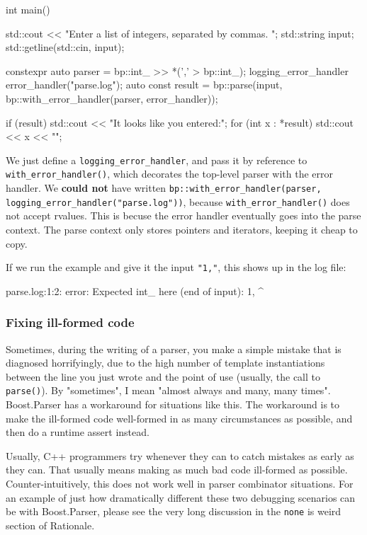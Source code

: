 \begin{code}
int main()
{
    std::cout << "Enter a list of integers, separated by commas. ";
    std::string input;
    std::getline(std::cin, input);

    constexpr auto parser = bp::int_ >> *(',' > bp::int_);
    logging_error_handler error_handler("parse.log");
    auto const result = bp::parse(input, bp::with_error_handler(parser, error_handler));

    if (result) {
        std::cout << "It looks like you entered:\n";
        for (int x : *result) {
            std::cout << x << "\n";
        }
    }
}
\end{code}

We just define a \texttt{logging\_error\_handler}, and pass it by reference to \texttt{with\_error\_handler()}, which decorates the top-level parser with the error handler. We \textbf{could not} have written \texttt{bp::with\_error\_handler(parser, logging\_error\_handler("parse.log"))}, because \texttt{with\_error\_handler()} does not accept rvalues. This is becuse the error handler eventually goes into the parse context. The parse context only stores pointers and iterators, keeping it cheap to copy.

If we run the example and give it the input \texttt{"1,"}, this shows up in the log file:

\begin{code}
parse.log:1:2: error: Expected int_ here (end of input):
1,
  ^
\end{code}

\subsubsection{Fixing ill-formed code}

Sometimes, during the writing of a parser, you make a simple mistake that is diagnosed horrifyingly, due to the high number of template instantiations between the line you just wrote and the point of use (usually, the call to \texttt{parse()}). By "sometimes", I mean "almost always and many, many times". Boost.Parser has a workaround for situations like this. The workaround is to make the ill-formed code well-formed in as many circumstances as possible, and then do a runtime assert instead.

Usually, C++ programmers try whenever they can to catch mistakes as early as they can. That usually means making as much bad code ill-formed as possible. Counter-intuitively, this does not work well in parser combinator situations. For an example of just how dramatically different these two debugging scenarios can be with Boost.Parser, please see the very long discussion in the \texttt{none} is weird section of Rationale.

